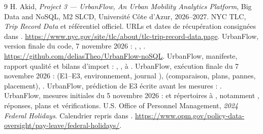 \begin{thebibliography}{9}\small
{} H. Akid, \emph{Project 3 --- UrbanFlow, An Urban Mobility Analytics Platform}, Big Data and NoSQL, M2 SLCD, Université Côte d'Azur, 2026--2027.
 NYC TLC, \emph{Trip Record Data} et référentiel officiel. URLs et dates de récupération consignées dans . \url{https://www.nyc.gov/site/tlc/about/tlc-trip-record-data.page}.
 UrbanFlow, version finale du code, 7 novembre 2026 : , , . \url{https://github.com/deliasTheo/UrbanFlow-noSQL}.
 UrbanFlow, manifeste, rapport qualité et bilans d'import : , ,  à .
 UrbanFlow, exécution finale du 7 novembre 2026 :  (E1--E3, environnement, journal ),  (comparaison, plans, pannes, placement), .
 UrbanFlow, prédiction de E3 écrite avant les mesures : .
 UrbanFlow, mesures initiales du 5 novembre 2026 :  et répertoires  à , notamment , réponses, plans et vérifications.
 U.S. Office of Personnel Management, \emph{2024 Federal Holidays}. Calendrier repris dans . \url{https://www.opm.gov/policy-data-oversight/pay-leave/federal-holidays/}.
\end{thebibliography}
